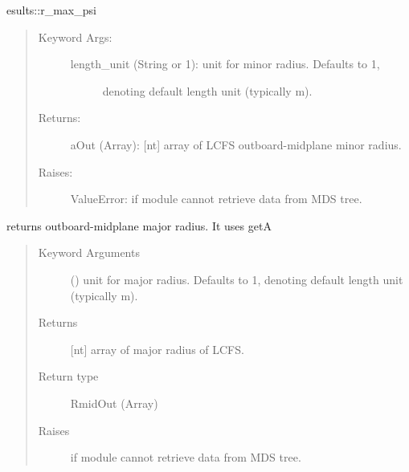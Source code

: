 \documentclass[letterpaper,10pt,english]{sphinxmanual}
\begin{document}
\begin{fulllineitems}
\begin{fulllineitems}
\begin{description}
\end{description}

esults::r\_max\_psi
\begin{quote}
\begin{description}
\item[{Keyword Args:}] \leavevmode\begin{description}
\item[{length\_unit (String or 1): unit for minor radius.  Defaults to 1,}] \leavevmode
denoting default length unit (typically m).

\end{description}

\item[{Returns:}] \leavevmode
aOut (Array): {[}nt{]} array of LCFS outboard-midplane minor radius.

\item[{Raises:}] \leavevmode
ValueError: if module cannot retrieve data from MDS tree.

\end{description}
\end{quote}

\end{fulllineitems}


\begin{fulllineitems}
\label{\detokenize{eqtools:eqtools.TCVLIUQE.TCVLIUQETree.getRmidOut}}
returns outboard-midplane major radius. It uses getA
\begin{quote}\begin{description}
\item[{Keyword Arguments}] \leavevmode
{} () \textendash{} unit for major radius.  Defaults to 1,
denoting default length unit (typically m).

\item[{Returns}] \leavevmode
{[}nt{]} array of major radius of LCFS.

\item[{Return type}] \leavevmode
RmidOut (Array)

\item[{Raises}] \leavevmode
{} \textendash{} if module cannot retrieve data from MDS tree.


\end{description}
\end{quote}
\end{fulllineitems}
\end{fulllineitems}
\end{document}

